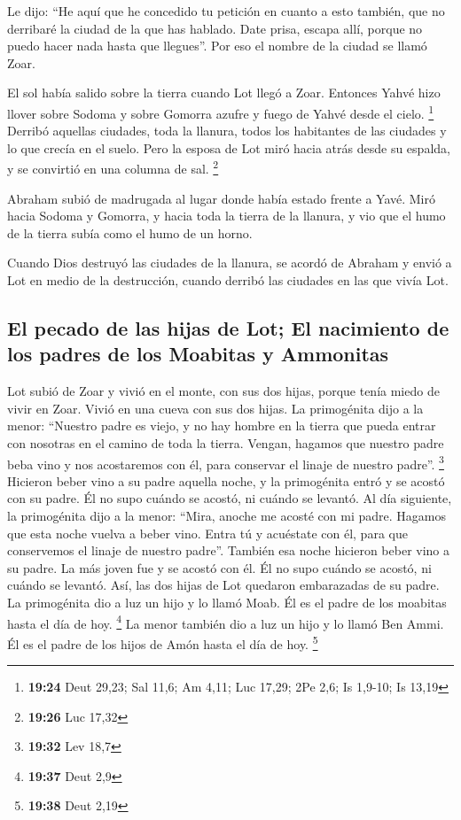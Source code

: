 Le dijo: ``He aquí que he concedido tu petición en
cuanto a esto también, que no derribaré la ciudad de la que has hablado.
 Date prisa, escapa allí, porque no puedo hacer nada
hasta que llegues''. Por eso el nombre de la ciudad se llamó Zoar.

 El sol había salido sobre la tierra cuando Lot llegó a
Zoar.  Entonces Yahvé hizo llover sobre Sodoma y sobre
Gomorra azufre y fuego de Yahvé desde el cielo. \footnote{\textbf{19:24}
  Deut 29,23; Sal 11,6; Am 4,11; Luc 17,29; 2Pe 2,6; Is 1,9-10; Is 13,19}
 Derribó aquellas ciudades, toda la llanura, todos los
habitantes de las ciudades y lo que crecía en el suelo. 
Pero la esposa de Lot miró hacia atrás desde su espalda, y se convirtió
en una columna de sal. \footnote{\textbf{19:26} Luc 17,32}

 Abraham subió de madrugada al lugar donde había estado
frente a Yavé.  Miró hacia Sodoma y Gomorra, y hacia toda
la tierra de la llanura, y vio que el humo de la tierra subía como el
humo de un horno.

 Cuando Dios destruyó las ciudades de la llanura, se
acordó de Abraham y envió a Lot en medio de la destrucción, cuando
derribó las ciudades en las que vivía Lot.

\hypertarget{el-pecado-de-las-hijas-de-lot-el-nacimiento-de-los-padres-de-los-moabitas-y-ammonitas}{%
\subsection{El pecado de las hijas de Lot; El nacimiento de los padres
de los Moabitas y
Ammonitas}\label{el-pecado-de-las-hijas-de-lot-el-nacimiento-de-los-padres-de-los-moabitas-y-ammonitas}}

 Lot subió de Zoar y vivió en el monte, con sus dos
hijas, porque tenía miedo de vivir en Zoar. Vivió en una cueva con sus
dos hijas.  La primogénita dijo a la menor: ``Nuestro
padre es viejo, y no hay hombre en la tierra que pueda entrar con
nosotras en el camino de toda la tierra.  Vengan, hagamos
que nuestro padre beba vino y nos acostaremos con él, para conservar el
linaje de nuestro padre''. \footnote{\textbf{19:32} Lev 18,7}
 Hicieron beber vino a su padre aquella noche, y la
primogénita entró y se acostó con su padre. Él no supo cuándo se acostó,
ni cuándo se levantó.  Al día siguiente, la primogénita
dijo a la menor: ``Mira, anoche me acosté con mi padre. Hagamos que esta
noche vuelva a beber vino. Entra tú y acuéstate con él, para que
conservemos el linaje de nuestro padre''.  También esa
noche hicieron beber vino a su padre. La más joven fue y se acostó con
él. Él no supo cuándo se acostó, ni cuándo se levantó. 
Así, las dos hijas de Lot quedaron embarazadas de su padre.
 La primogénita dio a luz un hijo y lo llamó Moab. Él es
el padre de los moabitas hasta el día de hoy. \footnote{\textbf{19:37}
  Deut 2,9}  La menor también dio a luz un hijo y lo
llamó Ben Ammi. Él es el padre de los hijos de Amón hasta el día de hoy.
\footnote{\textbf{19:38} Deut 2,19}

